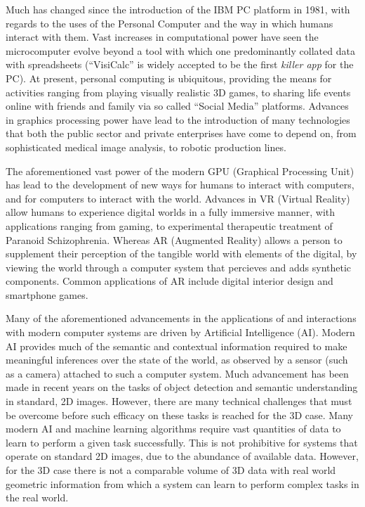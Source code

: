 Much has changed since the introduction of the IBM PC platform in 1981, with regards to the 
uses of the Personal Computer and the way in which humans interact with them. Vast increases 
in computational power have seen the microcomputer evolve beyond a tool with which one predominantly 
collated data with spreadsheets (``VisiCalc'' is widely accepted to be the first \textit{killer app}
for the PC). At present, personal computing is ubiquitous, providing the means for activities ranging 
from playing visually realistic 3D games, to sharing life events online with friends and family via 
so called ``Social Media'' platforms. Advances in graphics processing power have lead to the introduction 
of many technologies that both the public sector and private enterprises have come to depend on, from 
sophisticated medical image analysis, to robotic production lines.

The aforementioned vast power of the modern GPU (Graphical Processing Unit) has lead to the development 
of new ways for humans to interact with computers, and for computers to interact with the world. Advances 
in VR (Virtual Reality) allow humans to experience digital worlds in a fully immersive manner, with 
applications ranging from gaming, to experimental therapeutic treatment of Paranoid Schizophrenia. 
Whereas AR (Augmented Reality) allows a person to supplement their perception of the tangible world with 
elements of the digital, by viewing the world through a computer system that percieves and adds synthetic 
components. Common applications of AR include digital interior design and smartphone games.

Many of the aforementioned advancements in the applications of and interactions with modern computer 
systems are driven by Artificial Intelligence (AI). Modern AI provides much of the semantic and contextual 
information required to make meaningful inferences over the state of the world, as observed by a sensor 
(such as a camera) attached to such a computer system. Much advancement has been made in recent years on 
the tasks of object detection and semantic understanding in standard, 2D images. However, there are many 
technical challenges that must be overcome before such efficacy on these tasks is reached for the 3D 
case. Many modern AI and machine learning algorithms require vast quantities of data to learn to 
perform a given task successfully. This is not prohibitive for systems that operate on 
standard 2D images, due to the abundance of available data. However, for the 3D case there 
is not a comparable volume of 3D data with real world geometric information from which a system 
can learn to perform complex tasks in the real world.


